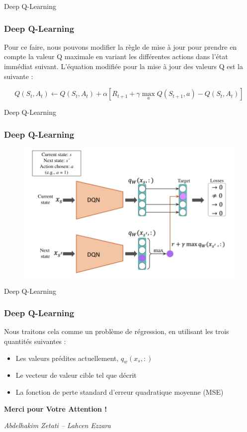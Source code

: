 \documentclass[serif, aspectratio=169]{beamer}
\begin{document}
\begin{frame}{Deep Q-Learning}
	\frametitle{Deep Q-Learning}
	
	Pour ce faire, nous pouvons modifier la règle de mise à jour pour prendre en compte la valeur Q maximale en variant les différentes actions dans l'état immédiat suivant. L'équation modifiée pour la mise à jour des valeurs Q est la suivante :
	
	\[
	Q(S_t, A_t) \leftarrow Q(S_t, A_t) + \alpha [R_{t+1} + \gamma \max_{a} Q(S_{t+1}, a) - Q(S_t, A_t)]
	\]
	
\end{frame}


\begin{frame}{Deep Q-Learning}
	\frametitle{Deep Q-Learning}
	
	\begin{figure}[htpb]
		\centering
		\includegraphics[keepaspectratio, scale=0.35]{images/dqn-target.png}
	\end{figure}
	
\end{frame}


\begin{frame}{Deep Q-Learning}
	\frametitle{Deep Q-Learning}
	
	Nous traitons cela comme un problème de régression, en utilisant les trois quantités suivantes :
	
	\begin{itemize}
		\item Les valeurs prédites actuellement, \( q_w(x_s, :) \)
		\item Le vecteur de valeur cible tel que décrit
		\item La fonction de perte standard d'erreur quadratique moyenne (MSE)
	\end{itemize}
	
\end{frame}




\begin{frame}
	\begin{center}
		
		\Huge \textbf{Merci pour Votre Attention !}
		
		\vspace{1cm}
		
		\Large
		
		\textit{Abdelhakim Zetati -- Lahcen Ezzara} \\
		

	\end{center}
\end{frame}
\end{document}

